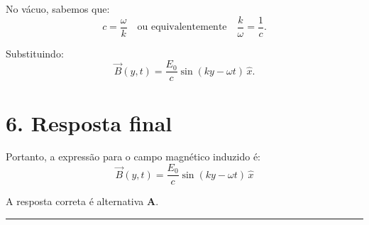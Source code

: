 \documentclass[a4paper,12pt]{article}
\begin{document}
\begin{flushleft}
No vácuo, sabemos que:
\[
c = \frac{\omega}{k} \quad \text{ou equivalentemente} \quad \frac{k}{\omega} = \frac{1}{c}.
\]

Substituindo:
\[
\vec{B}(y,t) = \frac{E_0}{c} \sin(k y - \omega t) \, \hat{x}.
\]

\section*{6. Resposta final}

Portanto, a expressão para o campo magnético induzido é:
\[
\boxed{
\vec{B}(y,t) = \frac{E_0}{c} \sin(k y - \omega t) \, \hat{x}
}
\]


A resposta correta é alternativa \colorbox{green!50}{\textbf{A}}.
\end{flushleft}

\noindent\rule{\linewidth}{0.6pt}\\
\end{document}
